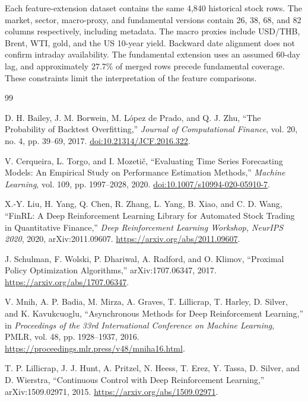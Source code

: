 \documentclass[12pt,a4paper,oneside]{book}
\theoremstyle{plain}
\numberwithin{equation}{chapter} \DeclareMathOperator{\Var}{Var}
\begin{document}
Each feature-extension dataset contains the same 4,840 historical stock rows. The market, sector, macro-proxy, and fundamental versions contain 26, 38, 68, and 82 columns respectively, including metadata. The macro proxies include USD/THB, Brent, WTI, gold, and the US 10-year yield. Backward date alignment does not confirm intraday availability. The fundamental extension uses an assumed 60-day lag, and approximately 27.7\% of merged rows precede fundamental coverage. These constraints limit the interpretation of the feature comparisons.
\clearpage
\begin{thebibliography}{99}
\footnotesize
\raggedright
\setlength{\itemsep}{0.5\baselineskip}

D. H. Bailey, J. M. Borwein, M. L\'opez de Prado, and Q. J. Zhu, “The Probability of Backtest Overfitting,” \emph{Journal of Computational Finance}, vol. 20, no. 4, pp. 39--69, 2017. \href{https://doi.org/10.21314/JCF.2016.322}{doi:10.21314/JCF.2016.322}.

V. Cerqueira, L. Torgo, and I. Mozeti\v{c}, “Evaluating Time Series Forecasting Models: An Empirical Study on Performance Estimation Methods,” \emph{Machine Learning}, vol. 109, pp. 1997--2028, 2020. \href{https://doi.org/10.1007/s10994-020-05910-7}{doi:10.1007/s10994-020-05910-7}.

X.-Y. Liu, H. Yang, Q. Chen, R. Zhang, L. Yang, B. Xiao, and C. D. Wang, “FinRL: A Deep Reinforcement Learning Library for Automated Stock Trading in Quantitative Finance,” \emph{Deep Reinforcement Learning Workshop, NeurIPS 2020}, 2020, arXiv:2011.09607. \url{https://arxiv.org/abs/2011.09607}.

J. Schulman, F. Wolski, P. Dhariwal, A. Radford, and O. Klimov, “Proximal Policy Optimization Algorithms,” arXiv:1707.06347, 2017. \url{https://arxiv.org/abs/1707.06347}.

V. Mnih, A. P. Badia, M. Mirza, A. Graves, T. Lillicrap, T. Harley, D. Silver, and K. Kavukcuoglu, “Asynchronous Methods for Deep Reinforcement Learning,” in \emph{Proceedings of the 33rd International Conference on Machine Learning}, PMLR, vol. 48, pp. 1928--1937, 2016. \url{https://proceedings.mlr.press/v48/mniha16.html}.

T. P. Lillicrap, J. J. Hunt, A. Pritzel, N. Heess, T. Erez, Y. Tassa, D. Silver, and D. Wierstra, “Continuous Control with Deep Reinforcement Learning,” arXiv:1509.02971, 2015. \url{https://arxiv.org/abs/1509.02971}.


\end{thebibliography}
\end{document}
